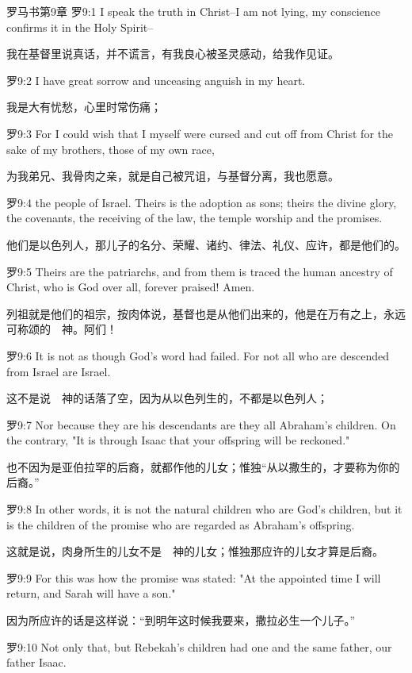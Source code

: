 \documentclass[a4paper,11pt,onecolumn,twoside]{ctexart}
\begin{document}
\begin{multicols}{2}
 罗马书第9章
 罗9:1
 I speak the truth in Christ--I am not lying, my conscience confirms it in the Holy Spirit--

 我在基督里说真话，并不谎言，有我良心被圣灵感动，给我作见证。


 罗9:2
 I have great sorrow and unceasing anguish in my heart.

 我是大有忧愁，心里时常伤痛；


 罗9:3
 For I could wish that I myself were cursed and cut off from Christ for the sake of my brothers, those of my own race,

 为我弟兄、我骨肉之亲，就是自己被咒诅，与基督分离，我也愿意。


 罗9:4
 the people of Israel. Theirs is the adoption as sons; theirs the divine glory, the covenants, the receiving of the law, the temple worship and the promises.

 他们是以色列人，那儿子的名分、荣耀、诸约、律法、礼仪、应许，都是他们的。


 罗9:5
 Theirs are the patriarchs, and from them is traced the human ancestry of Christ, who is God over all, forever praised! Amen.

 列祖就是他们的祖宗，按肉体说，基督也是从他们出来的，他是在万有之上，永远可称颂的　神。阿们！


 罗9:6
 It is not as though God's word had failed. For not all who are descended from Israel are Israel.

 这不是说　神的话落了空，因为从以色列生的，不都是以色列人；


 罗9:7
 Nor because they are his descendants are they all Abraham's children. On the contrary, "It is through Isaac that your offspring will be reckoned."

 也不因为是亚伯拉罕的后裔，就都作他的儿女；惟独“从以撒生的，才要称为你的后裔。”


 罗9:8
 In other words, it is not the natural children who are God's children, but it is the children of the promise who are regarded as Abraham's offspring.

 这就是说，肉身所生的儿女不是　神的儿女；惟独那应许的儿女才算是后裔。


 罗9:9
 For this was how the promise was stated: "At the appointed time I will return, and Sarah will have a son."

 因为所应许的话是这样说：“到明年这时候我要来，撒拉必生一个儿子。”


 罗9:10
 Not only that, but Rebekah's children had one and the same father, our father Isaac.


\end{multicols}
\end{document}
